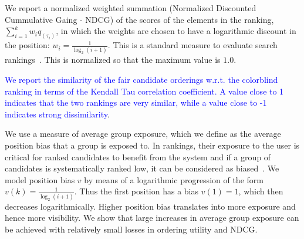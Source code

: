 %
We report a normalized weighted summation (Normalized Discounted Cummulative Gaing - NDCG) of the scores of the elements in the ranking, $\sum_{i=1}^{k} w_i q_{(\tau_i)}$, in which the weights are chosen to have a logarithmic discount in the position:  $w_i = \frac{1}{\log_2 (i+1)}$. This is a standard measure to evaluate search rankings~\cite{jarvelin2002cumulated}.
This is normalized so that the maximum value is $1.0$.

\textcolor{blue}{ We report the similarity of the fair candidate orderings w.r.t. the colorblind ranking in terms of the Kendall Tau correlation coefficient. 
	A value close to 1 indicates that the two rankings are very similar, while a value close to -1 indicates strong dissimilarity}.

 We use a measure of average group exposure, which we define as the average position bias that a group is exposed to.
%
In rankings, their exposure to the user is critical for ranked candidates to benefit from the system and if a group of candidates is systematically ranked low, it can be considered as biased~\cite{friedman1996bias}.
%
We model position bias $v$ by means of a logarithmic progression of the form $v(k) = \frac{1}{\log_2(i+1)}$.
%
Thus the first position has a bias $v(1)=1$, which then decreases logarithmically.
%
Higher position bias translates into more exposure and hence more visibility.
%
We show that large increases in average group exposure can be achieved with relatively small losses in ordering utility and NDCG.


